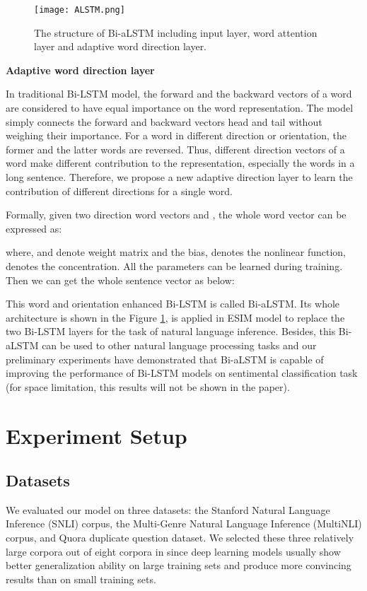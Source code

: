 \documentclass[10pt,sigconf]{acmart}
\begin{document}
\begin{figure}[t]
    \centering
    \texttt{[image: ALSTM.png]}
    \caption{The structure of Bi-aLSTM including input layer, word attention layer and adaptive word direction layer.}
    \label{fig:ALSTM-figl}
\end{figure}

\textbf{Adaptive word direction layer}

In traditional Bi-LSTM model, the forward and the backward vectors of a word are considered to have equal importance on the word representation. The model simply connects the forward and backward vectors head and tail without weighing their importance. For a word in different direction or orientation, the former and the latter words are reversed. Thus, different direction vectors of a word make different contribution to the representation, especially the words in a long sentence. Therefore, we propose a new adaptive direction layer to learn the contribution of different directions for a single word.

Formally, given two direction word vectors  and , the whole word vector can be expressed as:

where, and  denote weight matrix and the bias,  denotes the nonlinear function,  denotes the concentration. All the parameters can be learned during training. Then we can get the whole sentence vector as below:


This word and orientation enhanced Bi-LSTM is called Bi-aLSTM. Its whole architecture is shown in the Figure \ref{fig:ALSTM-figl}, is applied in ESIM model to replace the two Bi-LSTM layers for the task of natural language inference. Besides, this Bi-aLSTM can be used to other natural language processing tasks and our preliminary experiments have demonstrated that Bi-aLSTM is capable of improving the performance of Bi-LSTM models on sentimental classification task (for space limitation, this results will not be shown in the paper).










\section{Experiment Setup}
\subsection{Datasets}
We evaluated our model on three datasets: the Stanford Natural Language Inference (SNLI) corpus, the Multi-Genre Natural Language Inference (MultiNLI) corpus, and Quora duplicate question dataset. We selected these three relatively large corpora out of eight corpora in \cite{lan2018toolkit} since deep learning models usually show better generalization ability on large training sets and produce more convincing results than on small training sets.
\end{document}
